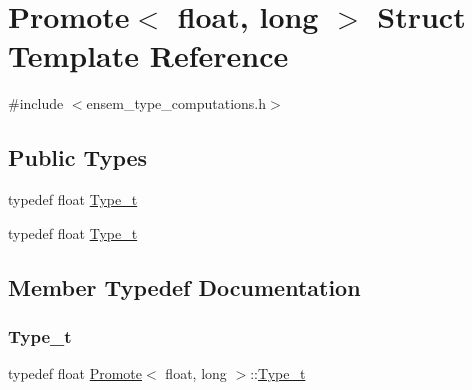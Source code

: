 \hypertarget{structPromote_3_01float_00_01long_01_4}{}\section{Promote$<$ float, long $>$ Struct Template Reference}
\label{structPromote_3_01float_00_01long_01_4}


{\ttfamily \#include $<$ensem\+\_\+type\+\_\+computations.\+h$>$}

\subsection*{Public Types}
\begin{DoxyCompactItemize}
\item 
typedef float \mbox{\hyperlink{structPromote_3_01float_00_01long_01_4_a6959e098474512ecba3473c0f5863033}{Type\+\_\+t}}
\item 
typedef float \mbox{\hyperlink{structPromote_3_01float_00_01long_01_4_a6959e098474512ecba3473c0f5863033}{Type\+\_\+t}}
\end{DoxyCompactItemize}


\subsection{Member Typedef Documentation}
\mbox{\label{structPromote_3_01float_00_01long_01_4_a6959e098474512ecba3473c0f5863033}} 
\subsubsection{\texorpdfstring{Type\_t}{Type\_t}\hspace{0.1cm}{\footnotesize\ttfamily [1/2]}}
{\footnotesize\ttfamily typedef float \mbox{\hyperlink{structPromote}{Promote}}$<$ float, long $>$\+::\mbox{\hyperlink{structPromote_3_01float_00_01long_01_4_a6959e098474512ecba3473c0f5863033}{Type\+\_\+t}}}

\mbox{\label{structPromote_3_01float_00_01long_01_4_a6959e098474512ecba3473c0f5863033}} 
